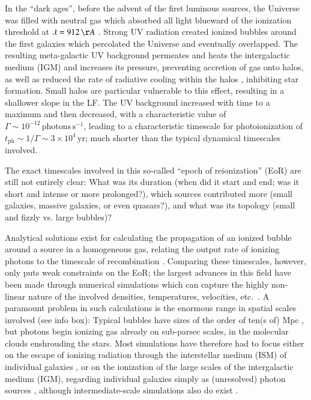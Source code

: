 \documentclass[useAMS,usenatbib,bibyear]{aa}
\begin{document}
In the ``dark ages'', before the advent of the first luminous sources, the Universe was filled with neutral gas which absorbed all light blueward of the ionization threshold at $\lambda = 912\,{\AA}$ \citep{Gnedin2000,Barkana2001}.
Strong UV radiation created ionized bubbles around the first galaxies which percolated the Universe and eventually overlapped.
The resulting meta-galactic UV background permeates and heats the intergalactic medium (IGM) and increases its pressure, preventing accretion of gas onto halos, as well as reduced the rate of radiative cooling within the halos \citep{Benson2002}, inhibiting star formation.
Small halos are particular vulnerable to this effect, resulting in a shallower slope in the LF.
The UV background increased with time to a maximum and then decreased, with a characteristic value of $\Gamma\sim10^{-12}\,\mathrm{photons}\,\mathrm{s}^{-1}$, leading to a characteristic timescale for photoionization of $t_\mathrm{ph} \sim 1/\Gamma \sim 3\times10^4\,\mathrm{yr}$; much shorter than the typical dynamical timescales involved.

The exact timescales involved in this so-called ``epoch of reionization'' (EoR) are still not entirely clear:
What was its duration (when did it start and end; was it short and intense or more prolonged?), which sources contributed more (small galaxies, massive galaxies, or even quasars?),
and what was its topology (small and fizzly vs. large bubbles)?

Analytical solutions exist for calculating the propagation of an ionized bubble around a source in a homogeneous gas, relating the output rate of ionizing photons to the timescale of recombination \citep{Stromgren1939,Dopita2003}.
Comparing these timescales, however, only puts weak constraints on the EoR; the largest advances in this field have been made through numerical simulations which can capture the highly non-linear nature of the involved densities, temperatures, velocities, etc.~\citep[see e.g.][for recent advances regarding the topology of reionization]{Hutter2020,Perez2022}.
A paramount problem in such calculations is the enormous range in spatial scales involved (see info box):
Typical bubbles have sizes of the order of ten(s of) Mpc \citep{Wyithe2004,Giri2018}, but photons begin ionizing gas already on sub-parsec scales, in the molecular clouds enshrouding the stars.
Most simulations have therefore had to focus either on the escape of ionizing radiation through the interstellar medium (ISM) of individual galaxies \citep[e.g.][]{Haid2019}, or on the ionization of the large scales of the intergalactic medium (IGM), regarding individual galaxies simply as (unresolved) photon sources \citep[e.g.][]{Jensen2013,Jensen2014}, although intermediate-scale simulations also do exist \citep[e.g.][]{Rosdahl2022}.
\end{document}
